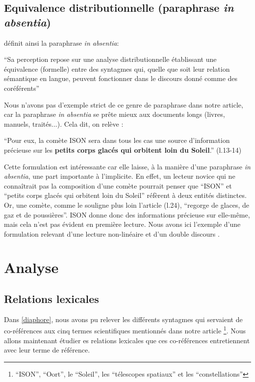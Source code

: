 \documentclass[a4paper,10pt]{article}
\begin{document}
	\subsection{Equivalence distributionnelle (paraphrase \textit{in absentia})}
		\cite{Mortureux1993} définit ainsi la paraphrase \textit{in absentia}:
		\begin{center}
			\footnotesize
			\begin{minipage}{0.7\textwidth}
				``Sa perception repose sur une analyse distributionnelle établissant une équivalence (formelle) entre des syntagmes qui, quelle que soit leur relation sémantique en langue, peuvent fonctionner dans le discours donné comme des coréférents''
			\end{minipage}
		\end{center}
		Nous n'avons pas d'exemple strict de ce genre de paraphrase dans notre article, car la paraphrase \textit{in absentia} se prête mieux aux documents longs (livres, manuels, traités...). Cela dit, on relève :
		\begin{center}
			\footnotesize
			\begin{minipage}{0.7\textwidth}
				``Pour eux, la comète ISON sera dans tous les cas une source d'information précieuse sur les \textbf{petits corps glacés qui orbitent loin du Soleil}.'' (l.13-14)
			\end{minipage}
		\end{center}
		Cette formulation est intéressante car elle laisse, à la manière d'une paraphrase \textit{in absentia}, une part importante à l'implicite. En effet, un lecteur novice qui ne connaîtrait pas la composition d'une comète pourrait penser que ``ISON'' et ``petits corps glacés qui orbitent loin du Soleil'' réfèrent à deux entités distinctes. Or, une comète, comme le souligne plus loin l'article (l.24), ``regorge de glaces, de gaz et de poussières''. ISON donne donc des informations précieuse sur elle-même, mais cela n'est pas évident en première lecture. Nous avons ici l'exemple d'une formulation relevant d'une lecture non-linéaire et d'un double discours \cite{Mortureux1984}.
		
\section{Analyse}
	\subsection{Relations lexicales}
		Dans \ref{diaphore}, nous avons pu relever les différents syntagmes qui servaient de co-références aux cinq termes scientifiques mentionnés dans notre article \footnote{``ISON'', ``Oort'', le ``Soleil'', les ``télescopes spatiaux'' et les ``constellations''}. Nous allons maintenant étudier es relations lexicales que ces co-références entretiennent avec leur terme de référence.
\end{document}
